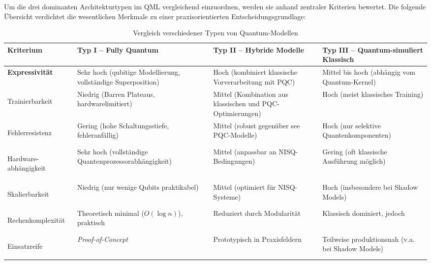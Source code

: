\noindent
Um die drei dominanten Architekturtypen im QML vergleichend einzuordnen, werden sie anhand zentraler Kriterien bewertet. Die folgende Übersicht verdichtet die wesentlichen Merkmale zu einer praxisorientierten Entscheidungsgrundlage:


\begin{table}[ht]
\centering
\small
\begin{tabular}{|>{\bfseries}m{2.5cm}|m{3cm}|m{3cm}|m{3cm}|}
\hline
Kriterium & Typ I – \textbf{Fully Quantum} & Typ II – \textbf{Hybride Modelle} & Typ III – \textbf{Quantum-simuliert Klassisch} \\
\hline

Expressivität & Sehr hoch (qubitige Modellierung, vollständige Superposition) & Hoch (kombiniert klassische Vorverarbeitung mit PQC) & Mittel bis hoch (abhängig vom Quantum-Kernel) \\
\hline

Trainierbarkeit & Niedrig (Barren Plateaus, hardwarelimitiert) & Mittel (Kombination aus klassischen und PQC-Optimierungen) & Hoch (meist klassisches Training) \\
\hline

Fehlerresistenz & Gering (hohe Schaltungsstiefe, fehleranfällig) & Mittel (robust gegenüber see PQC-Modelle) & Hoch (nur selektive Quantenkomponenten) \\
\hline

Hardware-
abhängigkeit & Sehr hoch (vollständige Quantenprozessorabhängigkeit) & Mittel (anpassbar an NISQ-Bedingungen) & Gering (oft klassische Ausführung möglich) \\
\hline

Skalierbarkeit & Niedrig (nur wenige Qubits praktikabel) & Mittel (optimiert für NISQ-Systeme) & Hoch (insbesondere bei Shadow Models) \\
\hline

Rechenkomplexität & Theoretisch minimal ($O(\log n)$), praktisch & Reduziert durch Modularität & Klassisch dominiert, jedoch \\
\hline

Einsatzreife & \textit{Proof-of-Concept} & Prototypisch in Praxisfeldern & Teilweise produktionsnah (v.a. bei Shadow Models) \\
\hline
\end{tabular}
\caption{Vergleich verschiedener Typen von Quantum-Modellen}
\end{table}


